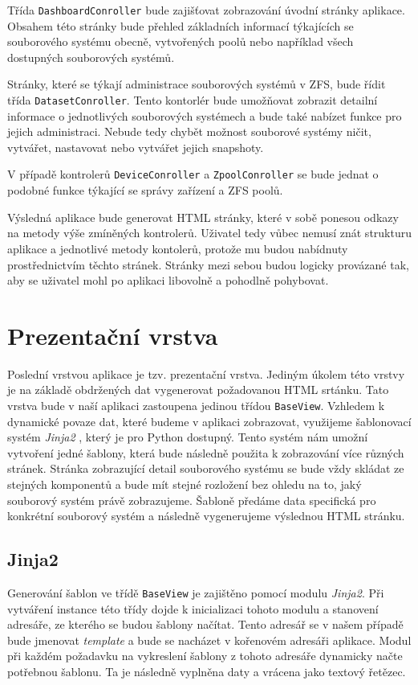     Třída \verb|DashboardConroller| bude zajišťovat zobrazování úvodní stránky aplikace. Obsahem této stránky bude přehled základních informací týkajících se souborového systému obecně, vytvořených poolů nebo například všech dostupných souborových systémů.

    Stránky, které se týkají administrace souborových systémů v ZFS, bude řídit třída \verb|DatasetConroller|. Tento kontorlér bude umožňovat zobrazit detailní informace o jednotlivých souborových systémech a bude také nabízet funkce pro jejich administraci. Nebude tedy chybět možnost souborové systémy ničit, vytvářet, nastavovat nebo vytvářet jejich snapshoty.

    V případě kontrolerů \verb|DeviceConroller| a \verb|ZpoolConroller| se bude jednat o podobné funkce týkající se správy zařízení a ZFS poolů.

    Výsledná aplikace bude generovat HTML stránky, které v sobě ponesou odkazy na metody výše zmíněných kontrolerů. Uživatel tedy vůbec nemusí znát strukturu aplikace a jednotlivé metody kontolerů, protože mu budou nabídnuty prostřednictvím těchto stránek. Stránky mezi sebou budou logicky provázané tak, aby se uživatel mohl po aplikaci libovolně a pohodlně pohybovat.

\section{Prezentační vrstva}
Poslední vrstvou aplikace je tzv. prezentační vrstva. Jediným úkolem této vrstvy je na základě obdržených dat vygenerovat požadovanou HTML srtánku. Tato vrstva bude v naší aplikaci zastoupena jedinou třídou \verb|BaseView|. Vzhledem k dynamické povaze dat, které budeme v aplikaci zobrazovat, využijeme šablonovací systém \emph{Jinja2} \cite{jinja2}, který je pro Python dostupný. Tento systém nám umožní vytvoření jedné šablony, která bude následně použita k zobrazování více různých stránek. Stránka zobrazující detail souborového systému se bude vždy skládat ze stejných komponentů a bude mít stejné rozložení bez ohledu na to, jaký souborový systém právě zobrazujeme. Šabloně předáme data specifická pro konkrétní souborový systém a následně vygenerujeme výslednou HTML stránku.
    \subsection{Jinja2}
    Generování šablon ve třídě \verb|BaseView| je zajištěno pomocí modulu \emph{Jinja2}. Při vytváření instance této třídy dojde k inicializaci tohoto modulu a stanovení adresáře, ze kterého se budou šablony načítat. Tento adresář se v našem případě bude jmenovat \emph{template} a bude se nacházet v kořenovém adresáři aplikace. Modul při každém požadavku na vykreslení šablony z tohoto adresáře dynamicky načte potřebnou šablonu. Ta je následně vyplněna daty a vrácena jako textový řetězec.
